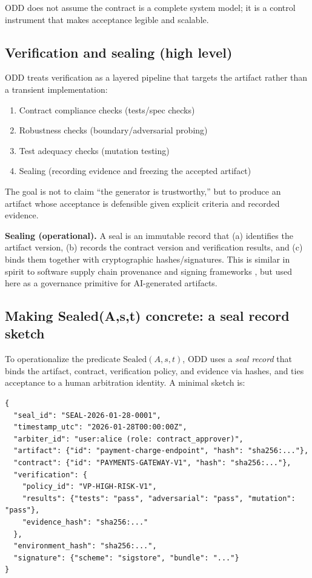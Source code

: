 \documentclass[conference]{IEEEtran}
\begin{document}
ODD does not assume the contract is a complete system model; it is a control instrument that makes acceptance legible and scalable.

\subsection{Verification and sealing (high level)}
ODD treats verification as a layered pipeline that targets the artifact rather than a transient implementation:
\begin{enumerate}
\item Contract compliance checks (tests/spec checks)
\item Robustness checks (boundary/adversarial probing)
\item Test adequacy checks (mutation testing) \cite{jia2011mutation, demillo1978testdata}
\item Sealing (recording evidence and freezing the accepted artifact)
\end{enumerate}

The goal is not to claim ``the generator is trustworthy,'' but to produce an artifact whose acceptance is defensible given explicit criteria and recorded evidence.

\textbf{Sealing (operational).} A seal is an immutable record that (a) identifies the artifact version, (b) records the contract version and verification results, and (c) binds them together with cryptographic hashes/signatures. This is similar in spirit to software supply chain provenance and signing frameworks \cite{torresarias2019intoto, openssf2023slsa, newman2022sigstore}, but used here as a governance primitive for AI-generated artifacts.

\subsection{Making Sealed(A,s,t) concrete: a seal record sketch}
To operationalize the predicate $\mathrm{Sealed}(A,s,t)$, ODD uses a \emph{seal record} that binds the artifact, contract, verification policy, and evidence via hashes, and ties acceptance to a human arbitration identity. A minimal sketch is:
\begin{lstlisting}
{
  "seal_id": "SEAL-2026-01-28-0001",
  "timestamp_utc": "2026-01-28T00:00:00Z",
  "arbiter_id": "user:alice (role: contract_approver)",
  "artifact": {"id": "payment-charge-endpoint", "hash": "sha256:..."},
  "contract": {"id": "PAYMENTS-GATEWAY-V1", "hash": "sha256:..."},
  "verification": {
    "policy_id": "VP-HIGH-RISK-V1",
    "results": {"tests": "pass", "adversarial": "pass", "mutation": "pass"},
    "evidence_hash": "sha256:..."
  },
  "environment_hash": "sha256:...",
  "signature": {"scheme": "sigstore", "bundle": "..."}
}
\end{lstlisting}
\end{document}
